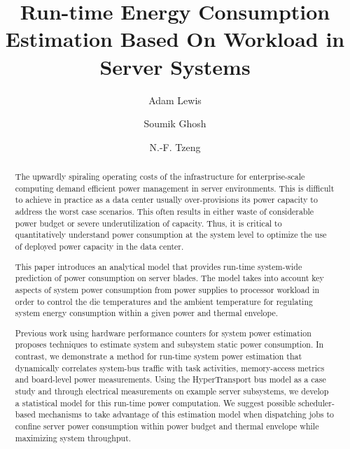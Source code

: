 \documentclass[times, 10pt,onecolumn]{article}
\begin{document}
\title{Run-time Energy Consumption Estimation Based On Workload in
  Server Systems}
\author[*]{}
\author[*]{Adam Lewis} 
\author[*]{Soumik Ghosh} 
\author[*]{N.-F. Tzeng}
\maketitle
\newtheorem{defn}{Definition}
\newtheorem{thm}{Theorem}
\thispagestyle{empty}
\doublespacing

\begin{abstract}
  The upwardly spiraling operating costs of the infrastructure for
  enterprise-scale computing demand efficient power management in server
  environments.  This is difficult to achieve in practice as a data
  center usually over-provisions its power capacity to address the worst
  case scenarios. This often results in either waste of considerable
  power budget or severe underutilization of capacity.  Thus, it is
  critical to quantitatively understand power consumption at the system
  level to optimize the use of deployed power capacity in the data
  center.

  This paper introduces an analytical model that provides run-time
  system-wide prediction of power consumption on server blades.  The
  model takes into account key aspects of system power consumption from
  power supplies to processor workload in order to control the die
  temperatures and the ambient temperature for regulating system energy
  consumption within a given power and thermal envelope.

  Previous work using hardware performance counters for system power
  estimation proposes techniques to estimate system and subsystem static
  power consumption.  In contrast, we demonstrate a method for run-time
  system power estimation that dynamically correlates system-bus traffic
  with task activities, memory-access metrics and board-level power
  measurements.  Using the HyperTransport bus model as a case study and
  through electrical measurements on example server subsystems, we
  develop a statistical model for this run-time power computation.  We
  suggest possible scheduler-based mechanisms to take advantage of this
  estimation model when dispatching jobs to confine server power
  consumption within power budget and thermal envelope while maximizing
  system throughput.
\end{abstract}
\end{document}
